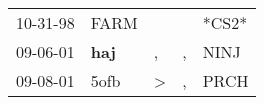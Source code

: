 \begin{supertabular}{p{0.07\textwidth}p{0.06\textwidth}p{0.02\textwidth}p{0.02\textwidth}p{0.06\textwidth}}
 10-31-98\textsuperscript{} &          FARM\textsuperscript{} &               &    &                   *CS2* \\
 09-06-01\textsuperscript{} &  \textbf{haj\textsuperscript{}} &             , &  , &  NINJ\textsuperscript{} \\
 09-08-01\textsuperscript{} &          5ofb\textsuperscript{} &  \textgreater &  , &  PRCH\textsuperscript{} \\
\end{supertabular}
